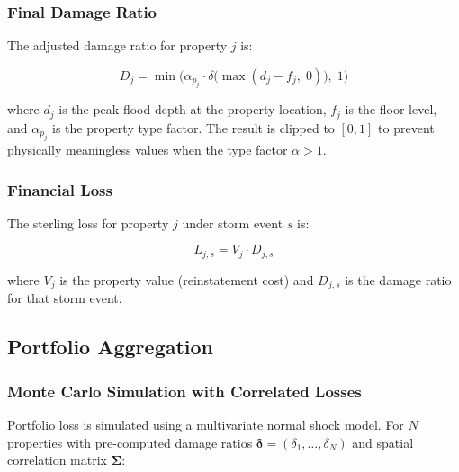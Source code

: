 \documentclass[11pt,a4paper]{article}
\begin{document}
\subsubsection{Final Damage Ratio}

The adjusted damage ratio for property $j$ is:

\begin{equation}
    D_j = \min\!\Big(\alpha_{p_j} \cdot \delta\big(\max(d_j - f_j, \; 0)\big), \; 1\Big)
    \label{eq:final_damage}
\end{equation}

\noindent where $d_j$ is the peak flood depth at the property location, $f_j$ is
the floor level, and $\alpha_{p_j}$ is the property type factor. The result is
clipped to $[0, 1]$ to prevent physically meaningless values when the type factor
$\alpha > 1$.

\subsubsection{Financial Loss}

The sterling loss for property $j$ under storm event $s$ is:

\begin{equation}
    L_{j,s} = V_j \cdot D_{j,s}
    \label{eq:fin_loss}
\end{equation}

\noindent where $V_j$ is the property value (reinstatement cost) and $D_{j,s}$ is
the damage ratio for that storm event.

\subsection{Portfolio Aggregation}
\label{sec:portfolio}

\subsubsection{Monte Carlo Simulation with Correlated Losses}

Portfolio loss is simulated using a multivariate normal shock model. For $N$
properties with pre-computed damage ratios $\boldsymbol{\delta} = (\delta_1, \ldots,
\delta_N)$ and spatial correlation matrix $\boldsymbol{\Sigma}$:
\end{document}
